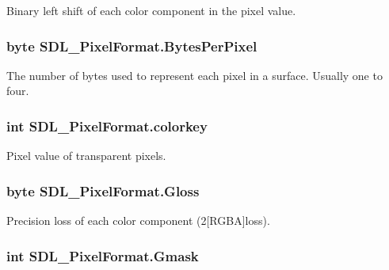 Binary left shift of each color component in the pixel value. 

\hypertarget{struct_s_d_l___pixel_format_ad504a9f390e02c8e508419d1a85202f8}{
\subsubsection[{BytesPerPixel}]{\setlength{\rightskip}{0pt plus 5cm}byte {\bf SDL\_\-PixelFormat.BytesPerPixel}}}
\label{struct_s_d_l___pixel_format_ad504a9f390e02c8e508419d1a85202f8}


The number of bytes used to represent each pixel in a surface. Usually one to four. 

\hypertarget{struct_s_d_l___pixel_format_ab4cf7cddc2293f9b6bb61bb60d06ad5d}{
\subsubsection[{colorkey}]{\setlength{\rightskip}{0pt plus 5cm}int {\bf SDL\_\-PixelFormat.colorkey}}}
\label{struct_s_d_l___pixel_format_ab4cf7cddc2293f9b6bb61bb60d06ad5d}


Pixel value of transparent pixels. 

\hypertarget{struct_s_d_l___pixel_format_aa54c85bb3f6868c7c66e7dc58ad6be26}{
\subsubsection[{Gloss}]{\setlength{\rightskip}{0pt plus 5cm}byte {\bf SDL\_\-PixelFormat.Gloss}}}
\label{struct_s_d_l___pixel_format_aa54c85bb3f6868c7c66e7dc58ad6be26}


Precision loss of each color component (2\mbox{[}RGBA\mbox{]}loss). 

\hypertarget{struct_s_d_l___pixel_format_a4a058dff33543ce36cfcf3f2771b40c4}{
\subsubsection[{Gmask}]{\setlength{\rightskip}{0pt plus 5cm}int {\bf SDL\_\-PixelFormat.Gmask}}}
\label{struct_s_d_l___pixel_format_a4a058dff33543ce36cfcf3f2771b40c4}


